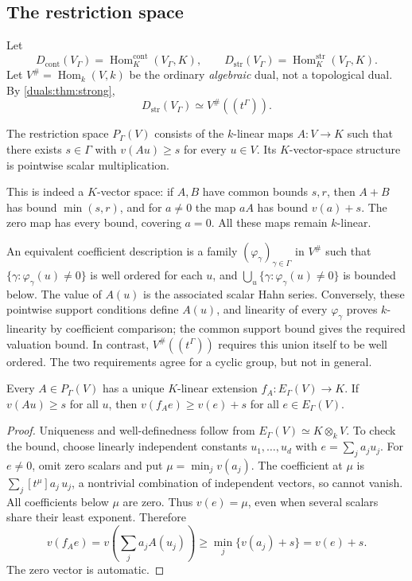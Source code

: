 \documentclass[11pt,letterpaper]{article}
\numberwithin{equation}{section}
\theoremstyle{definition}
\theoremstyle{remark}
\newcommand{\Hom}{\operatorname{Hom}}
\newcommand{\Dstr}{D_{\mathrm{str}}}
\newcommand{\Dcont}{D_{\mathrm{cont}}}
\begin{document}
\subsection{The restriction space}
Let
\[
 \Dcont(V_\Gamma)=\Hom_K^{\mathrm{cont}}(V_\Gamma,K),
 \qquad
 \Dstr(V_\Gamma)=\Hom_K^{\mathrm{str}}(V_\Gamma,K).
\]
Let $V^\#=\Hom_k(V,k)$ be the ordinary \emph{algebraic} dual, not a
topological dual. By \cref{duals:thm:strong},
\begin{equation}\label{duals:eq:strong-dual}
 \Dstr(V_\Gamma)\simeq V^\#((t^\Gamma)).
\end{equation}

\begin{definition}\label{duals:def:restriction-space}
The restriction space $P_\Gamma(V)$ consists of the $k$-linear maps
$A:V\to K$ such that there exists $s\in\Gamma$ with
$v(Au)\ge s$ for every $u\in V$. Its $K$-vector-space structure is
pointwise scalar multiplication.
\end{definition}

This is indeed a $K$-vector space: if $A,B$ have common bounds $s,r$,
then $A+B$ has bound $\min(s,r)$, and for $a\ne0$ the map $aA$ has
bound $v(a)+s$. The zero map has every bound, covering $a=0$.
All these maps remain $k$-linear.

An equivalent coefficient description is a family
$(\varphi_\gamma)_{\gamma\in\Gamma}$ in $V^\#$ such that
$\{\gamma:\varphi_\gamma(u)\ne0\}$ is well ordered for each $u$, and
$\bigcup_u\{\gamma:\varphi_\gamma(u)\ne0\}$ is bounded below. The
value of $A(u)$ is the associated scalar Hahn series. Conversely, these
pointwise support conditions define $A(u)$, and linearity of every
$\varphi_\gamma$ proves $k$-linearity by coefficient comparison; the
common support bound gives the required valuation bound. In contrast,
$V^\#((t^\Gamma))$ requires this union itself to be well ordered.
The two requirements agree for a cyclic group, but not in general.

\begin{lemma}
\label{duals:lem:E-extension}
Every $A\in P_\Gamma(V)$ has a unique $K$-linear extension
$f_A:E_\Gamma(V)\to K$. If $v(Au)\ge s$ for all $u$, then
$v(f_Ae)\ge v(e)+s$ for all $e\in E_\Gamma(V)$.
\end{lemma}
\begin{proof}
Uniqueness and well-definedness follow from
$E_\Gamma(V)\simeq K\otimes_kV$. To check the bound, choose linearly
independent constants $u_1,\ldots,u_d$ with
$e=\sum_ja_ju_j$. For $e\ne0$, omit zero scalars and put
$\mu=\min_jv(a_j)$. The coefficient at $\mu$ is
$\sum_j[t^\mu]a_j\,u_j$, a nontrivial combination of independent
vectors, so cannot vanish. All coefficients below $\mu$ are zero.
Thus $v(e)=\mu$, even when several scalars share their least exponent.
Therefore
\[
 v(f_Ae)=v\left(\sum_ja_jA(u_j)\right)
 \ge\min_j\{v(a_j)+s\}=v(e)+s.
\]
The zero vector is automatic.
\end{proof}
\end{document}

